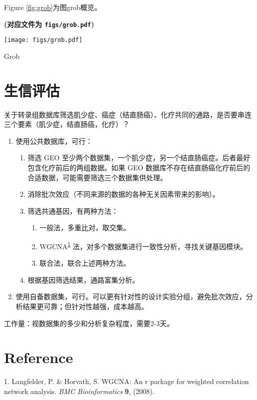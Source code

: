 \documentclass[
]{article}
\providecommand{\tightlist}{%
  \setlength{\itemsep}{0pt}\setlength{\parskip}{0pt}}
\newenvironment{cslreferences}%
  {}%
  {\par}
\begin{document}
Figure \ref{fig:grob}为图grob概览。

\textbf{(对应文件为 \texttt{figs/grob.pdf})}

\def\@captype{figure}
\begin{center}
\texttt{[image: figs/grob.pdf]}
\caption{Grob}\label{fig:grob}
\end{center}

\hypertarget{ux751fux4fe1ux8bc4ux4f30}{%
\section{生信评估}\label{ux751fux4fe1ux8bc4ux4f30}}

关于转录组数据库筛选肌少症、癌症（结直肠癌）、化疗共同的通路，是否要串连三个要素（肌少症，结直肠癌，化疗）？

\begin{enumerate}
\def\labelenumi{\arabic{enumi}.}
\tightlist
\item
  使用公共数据库，可行：

  \begin{enumerate}
  \def\labelenumii{\arabic{enumii}.}
  \tightlist
  \item
    筛选 GEO 至少两个数据集，一个肌少症，另一个结直肠癌症。后者最好包含化疗前后的两组数据。如果 GEO 数据库不存在结直肠癌化疗前后的合适数据，可能需要筛选三个数据集供处理。
  \item
    消除批次效应（不同来源的数据的各种无关因素带来的影响）。
  \item
    筛选共通基因，有两种方法：

    \begin{enumerate}
    \def\labelenumiii{\arabic{enumiii}.}
    \tightlist
    \item
      一般法，多重比对，取交集。
    \item
      WGCNA\textsuperscript{\protect\hyperlink{ref-WgcnaAnRPacLangfe2008}{1}} 法，对多个数据集进行一致性分析，寻找关键基因模块。
    \item
      联合法，联合上述两种方法。
    \end{enumerate}
  \item
    根据基因筛选结果，通路富集分析。
  \end{enumerate}
\item
  使用自备数据集，可行。可以更有针对性的设计实验分组，避免批次效应，分析结果更可靠；但针对性越强，成本越高。
\end{enumerate}

工作量：视数据集的多少和分析复杂程度，需要2-3天。

\hypertarget{bibliography}{%
\section*{Reference}\label{bibliography}}

\hypertarget{refs}{}
\begin{cslreferences}
\leavevmode\hypertarget{ref-WgcnaAnRPacLangfe2008}{}%
1. Langfelder, P. \& Horvath, S. WGCNA: An r package for weighted correlation network analysis. \emph{BMC Bioinformatics} \textbf{9}, (2008).
\end{cslreferences}
\end{document}
